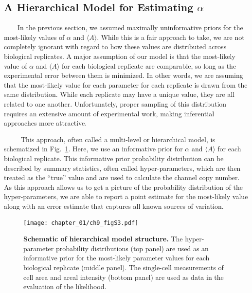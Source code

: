 \documentclass[12pt]{caltech_thesis}
\begin{document}
\hypertarget{a-hierarchical-model-for-estimating-alpha}{%
\subsection{\texorpdfstring{A Hierarchical Model for Estimating
\(\alpha\)}{A Hierarchical Model for Estimating \textbackslash alpha}}\label{a-hierarchical-model-for-estimating-alpha}}

~~~~In the previous section, we assumed maximally uninformative priors
for the most-likely values of \(\alpha\) and \(\langle A \rangle\).
While this is a fair approach to take, we are not completely ignorant
with regard to how these values are distributed across biological
replicates. A major assumption of our model is that the most-likely
value of \(\alpha\) and \(\langle A \rangle\) for each biological
replicate are comparable, so long as the experimental error between them
is minimized. In other words, we are assuming that the most-likely value
for each parameter for each replicate is drawn from the same
distribution. While each replicate may have a unique value, they are all
related to one another. Unfortunately, proper sampling of this
distribution requires an extensive amount of experimental work, making
inferential approaches more attractive.

~~~~~This approach, often called a multi-level or hierarchical model, is
schematized in Fig.~\ref{fig:hierarchical_model}. Here, we use an
informative prior for \(\alpha\) and \(\langle A \rangle\) for each
biological replicate. This informative prior probability distribution
can be described by summary statistics, often called hyper-parameters,
which are then treated as the ``true'' value and are used to calculate
the channel copy number. As this approach allows us to get a picture of
the probability distribution of the hyper-parameters, we are able to
report a point estimate for the most-likely value along with an error
estimate that captures all known sources of variation.

\hypertarget{fig:hierarchical_model}{%
\begin{figure}
\centering
\texttt{[image: chapter\_01/ch9\_figS3.pdf]}
\caption[{Schematic of hierarchical model structure for estimating
MscL-sfGFP fluorescence calibration factor.}]{\textbf{Schematic of
hierarchical model structure.} The hyper-parameter probability
distributions (top panel) are used as an informative prior for the
most-likely parameter values for each biological replicate (middle
panel). The single-cell measurements of cell area and areal intensity
(bottom panel) are used as data in the evaluation of the likelihood.}
\label{fig:hierarchical_model}
\end{figure}
}
\end{document}
